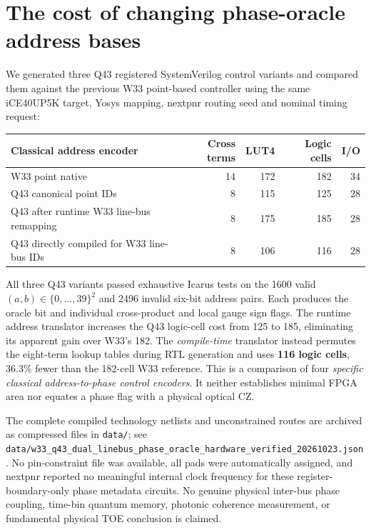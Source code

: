 \documentclass[10pt]{article}
\begin{document}
\section{The cost of changing phase-oracle address bases}
We generated three Q43 registered SystemVerilog
control variants and compared them against the
previous W33 point-based controller using the
same iCE40UP5K target, Yosys mapping,
nextpnr routing seed and nominal timing request:
\begin{center}
\begin{tabular}{lrrrr}
\toprule
Classical address encoder & Cross terms & LUT4 & Logic cells & I/O\\
\midrule
W33 point native &14&172&182&34\\
Q43 canonical point IDs &8&115&125&28\\
Q43 after runtime W33 line-bus remapping &8&175&185&28\\
Q43 directly compiled for W33 line-bus IDs &8&106&116&28\\
\bottomrule
\end{tabular}
\end{center}
All three Q43 variants passed exhaustive Icarus
tests on the 1600 valid $(a,b)\in\{0,\ldots,39\}^2$
and 2496 invalid six-bit address pairs. Each
produces the oracle bit and individual
cross-product and local gauge sign flags.
The runtime address translator increases the
Q43 logic-cell cost from 125 to 185, eliminating
its apparent gain over W33's 182.
The \emph{compile-time} translator instead
permutes the eight-term lookup tables during
RTL generation and uses \textbf{116 logic cells},
36.3\% fewer than the 182-cell W33 reference.
This is a comparison of four \emph{specific
classical address-to-phase control encoders}.
It neither establishes minimal FPGA area nor
equates a phase flag with a physical optical CZ.

The complete compiled technology netlists and
unconstrained routes are archived as compressed
files in \texttt{data/}; see
\texttt{data/w33\_q43\_dual\_linebus\_phase\_oracle\_hardware\_verified\_20261023.json}.
No pin-constraint file was available,
all pads were automatically assigned, and
nextpnr reported no meaningful internal clock
frequency for these register-boundary-only
phase metadata circuits. No genuine
physical inter-bus phase coupling, time-bin
quantum memory, photonic coherence measurement,
or fundamental physical TOE conclusion
is claimed.
\end{document}
